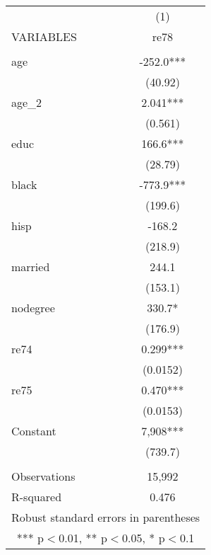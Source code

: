\begin{tabular}{lc} \hline
 & (1) \\
VARIABLES & re78 \\ \hline
 &  \\
age & -252.0*** \\
 & (40.92) \\
age\_2 & 2.041*** \\
 & (0.561) \\
educ & 166.6*** \\
 & (28.79) \\
black & -773.9*** \\
 & (199.6) \\
hisp & -168.2 \\
 & (218.9) \\
married & 244.1 \\
 & (153.1) \\
nodegree & 330.7* \\
 & (176.9) \\
re74 & 0.299*** \\
 & (0.0152) \\
re75 & 0.470*** \\
 & (0.0153) \\
Constant & 7,908*** \\
 & (739.7) \\
 &  \\
Observations & 15,992 \\
 R-squared & 0.476 \\ \hline
\multicolumn{2}{c}{ Robust standard errors in parentheses} \\
\multicolumn{2}{c}{ *** p$<$0.01, ** p$<$0.05, * p$<$0.1} \\
\end{tabular}
